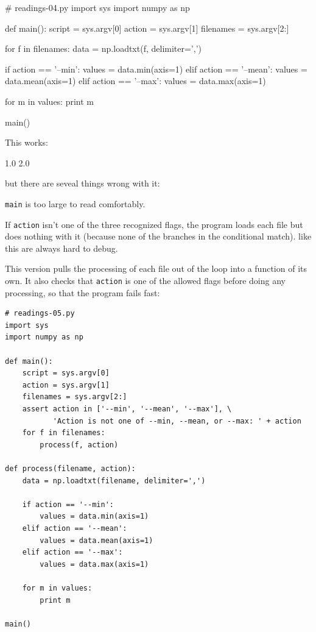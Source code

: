 \begin{VerbIn}
# readings-04.py
import sys
import numpy as np

def main():
    script = sys.argv[0]
    action = sys.argv[1]
    filenames = sys.argv[2:]

    for f in filenames:
        data = np.loadtxt(f, delimiter=',')

        if action == '--min':
            values = data.min(axis=1)
        elif action == '--mean':
            values = data.mean(axis=1)
        elif action == '--max':
            values = data.max(axis=1)

        for m in values:
            print m

main()
\end{VerbIn}

This works:


\begin{VerbOut}
1.0
2.0
\end{VerbOut}

but there are seveal things wrong with it:

\begin{swcenumerate}
\item
  \texttt{main} is too large to read comfortably.
\item
  If \texttt{action} isn't one of the three recognized flags, the
  program loads each file but does nothing with it (because none of the
  branches in the conditional match).  like this are always hard to debug.
\end{swcenumerate}

This version pulls the processing of each file out of the loop into a
function of its own. It also checks that \texttt{action} is one of the
allowed flags before doing any processing, so that the program fails
fast:

\begin{Verbatim}
# readings-05.py
import sys
import numpy as np

def main():
    script = sys.argv[0]
    action = sys.argv[1]
    filenames = sys.argv[2:]
    assert action in ['--min', '--mean', '--max'], \
           'Action is not one of --min, --mean, or --max: ' + action
    for f in filenames:
        process(f, action)

def process(filename, action):
    data = np.loadtxt(filename, delimiter=',')

    if action == '--min':
        values = data.min(axis=1)
    elif action == '--mean':
        values = data.mean(axis=1)
    elif action == '--max':
        values = data.max(axis=1)

    for m in values:
        print m

main()
\end{Verbatim}

